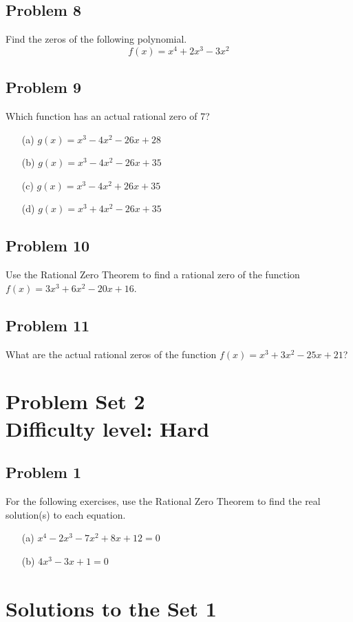 \documentclass[12pt]{article}
\begin{document}
\subsection*{Problem 8}
Find the zeros of the following polynomial.
\[f(x)=x^4+2x^3-3x^2\]

\subsection*{Problem 9}
Which function has an actual rational zero of 7?
\begin{enumerate}
    \item[(a)] \(g(x)=x^3-4x^2-26x+28\)
    \item[(b)] \(g(x)=x^3-4x^2-26x+35\)
    \item[(c)] \(g(x)=x^3-4x^2+26x+35\)
    \item[(d)] \(g(x)=x^3+4x^2-26x+35\)
\end{enumerate}

\subsection*{Problem 10}
Use the Rational Zero Theorem to find a rational zero of the function \(f(x)=3x^3+6x^2-20x+16\).

\subsection*{Problem 11}
What are the actual rational zeros of the function \(f(x)=x^3+3x^2-25x+21\)?


\section*{Problem Set 2\\Difficulty level: Hard}
\subsection*{Problem 1}
For the following exercises, use the Rational Zero Theorem to find the real solution(s) to each equation.
\begin{enumerate}
    \item[(a)] \(x^4-2x^3-7x^2+8x+12=0\)
    \item[(b)] \(4x^3-3x+1=0\)
\end{enumerate}


\newpage
\section*{Solutions to the Set 1}
\end{document}
